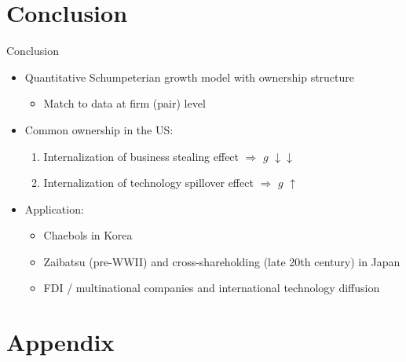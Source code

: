 \documentclass[
  aspectratio=169,  %
  handout           %
]{beamer}
\theoremstyle{plain}
\begin{document}
\section{Conclusion}
\begin{frame}{Conclusion}
  \begin{itemize}
    \item Quantitative Schumpeterian growth model with ownership structure
          \begin{itemize}
            \item Match to data at firm (pair) level\medskip{}
          \end{itemize}
          \medskip{}
    \item Common ownership in the US:
          \begin{enumerate}
            \item Internalization of business stealing effect $\Longrightarrow$ $g$ $\downarrow$$\downarrow$
            \item Internalization of technology spillover effect $\Longrightarrow$ $g$ $\uparrow$
          \end{enumerate}
          \medskip{}
    \item Application:
          \begin{itemize}
            \item Chaebols in Korea
            \item Zaibatsu (pre-WWII) and cross-shareholding (late 20th century) in Japan
            \item FDI / multinational companies and international technology diffusion
          \end{itemize}
  \end{itemize}
\end{frame}

\appendix

\section{Appendix}
\end{document}
